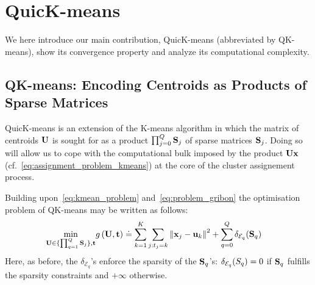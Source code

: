 
\section{QuicK-means}
\label{sec:contribution}

We here introduce our main contribution, QuicK-means (abbreviated by QK-means), 
show its convergence property and analyze its computational complexity.

\subsection{QK-means: Encoding Centroids as Products of Sparse Matrices}

QuicK-means is an extension of the K-means algorithm in which the matrix of centroids ${\mathbf{U}}$
is sought for as a product $\prod_{j=0}^Q{\mathbf{S}}_j$ of sparse matrices ${\mathbf{S}}_j$.
Doing so will allow us to cope with the computational bulk imposed by the product ${\mathbf{U}}{\mathbf{x}}$
(cf.~\eqref{eq:assignment_problem_kmeans}) at the core of the cluster assignement process.

Building upon~\eqref{eq:kmean_problem} and~\eqref{eq:problem_gribon} the optimisation problem 
of QK-means may be written as follows:
%
\begin{align}
\label{eq:qmean_problem}
 \min_{{\mathbf{U}}\in\{\prod_{q=1}^Q{\mathbf{S}}_j\}, {\mathbf{t}}} & g\left({\mathbf{U}}, {\mathbf{t}}\right)
    \doteq \sum_{k=1}^{K}\sum_{j: t_j = k} \left\|{\mathbf{x}}_j -{\mathbf{u}}_k\right\|^2 + \sum_{q=0}^{Q} \delta_{\mathcal{E}_q}({\mathbf{S}}_q)
\end{align}
%
Here, 
as before, the $\delta_{\mathcal{E}_q}$'s enforce the sparsity of the ${\mathbf{S}}_q$'s: $\delta_{\mathcal{E}_q}({S}_q)=0$ if ${\mathbf{S}}_q$ fulfills the sparsity constraints
and $+\infty$ otherwise.



